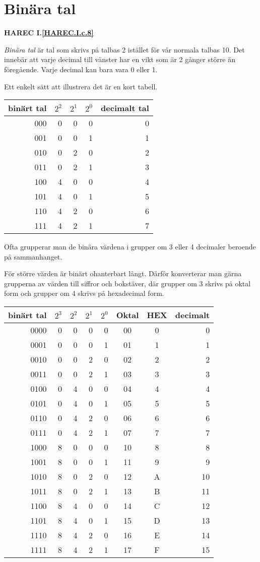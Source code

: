 \section{Binära tal}
\textbf{HAREC I.\ref{HAREC.I.c.8}\label{myHAREC.I.c.8}}

\emph{Binära tal} är tal som skrivs på talbas 2 istället för vår normala
talbas 10.
Det innebär att varje decimal till vänster har en vikt som är 2 gånger större
än föregående.
Varje decimal kan bara vara 0 eller 1.

Ett enkelt sätt att illustrera det är en kort tabell.

\begin{tabular}{r|rrr|r}
  binärt tal & \(2^2\) & \(2^1\) & \(2^0\) & decimalt tal \\ \hline
  000 & 0 & 0 & 0 & 0 \\
  001 & 0 & 0 & 1 & 1 \\
  010 & 0 & 2 & 0 & 2 \\
  011 & 0 & 2 & 1 & 3 \\
  100 & 4 & 0 & 0 & 4 \\
  101 & 4 & 0 & 1 & 5 \\
  110 & 4 & 2 & 0 & 6 \\
  111 & 4 & 2 & 1 & 7 \\
\end{tabular}

Ofta grupperar man de binära värdena i grupper om 3 eller 4 decimaler
beroende på sammanhanget.

För större värden är binärt ohanterbart långt.
Därför konverterar man gärna grupperna av värden till siffror och bokstäver,
där grupper om 3 skrivs på oktal form och grupper om 4 skrivs på hexadecimal
form.

\begin{tabular}{r|rrrr|c|c|r}
  binärt tal & \(2^3\) & \(2^2\) & \(2^1\) & \(2^0\) & Oktal & HEX & decimalt\\ \hline
  0000 & 0 & 0 & 0 & 0 & 00 & 0 & 0 \\
  0001 & 0 & 0 & 0 & 1 & 01 & 1 & 1 \\
  0010 & 0 & 0 & 2 & 0 & 02 & 2 & 2 \\
  0011 & 0 & 0 & 2 & 1 & 03 & 3 & 3 \\
  0100 & 0 & 4 & 0 & 0 & 04 & 4 & 4 \\
  0101 & 0 & 4 & 0 & 1 & 05 & 5 & 5 \\
  0110 & 0 & 4 & 2 & 0 & 06 & 6 & 6 \\
  0111 & 0 & 4 & 2 & 1 & 07 & 7 & 7 \\
  1000 & 8 & 0 & 0 & 0 & 10 & 8 & 8 \\
  1001 & 8 & 0 & 0 & 1 & 11 & 9 & 9 \\
  1010 & 8 & 0 & 2 & 0 & 12 & A & 10 \\
  1011 & 8 & 0 & 2 & 1 & 13 & B & 11 \\
  1100 & 8 & 4 & 0 & 0 & 14 & C & 12 \\
  1101 & 8 & 4 & 0 & 1 & 15 & D & 13 \\
  1110 & 8 & 4 & 2 & 0 & 16 & E & 14 \\
  1111 & 8 & 4 & 2 & 1 & 17 & F & 15 \\
\end{tabular}
